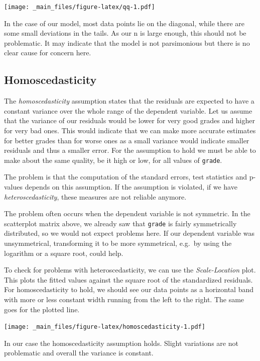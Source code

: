 \documentclass[
]{book}
\begin{document}
\texttt{[image: \_main\_files/figure-latex/qq-1.pdf]}

In the case of our model, most data points lie on the diagonal, while there are
some small deviations in the tails. As our n is large enough, this should not be
problematic. It may indicate that the model is not parsimonious but there is
no clear cause for concern here.

\hypertarget{homoscedasticity}{%
\subsection{Homoscedasticity}\label{homoscedasticity}}

The \emph{homoscedasticity} assumption states that the residuals are expected to have
a constant variance over the whole range of the dependent variable. Let us
assume that the variance of our residuals would be lower for very good grades
and higher for very bad ones. This would indicate that we can make more accurate
estimates for better grades than for worse ones as a small variance would
indicate smaller residuals and thus a smaller error. For the assumption to hold
we must be able to make about the same quality, be it high or low, for all
values of \texttt{grade}.

The problem is that the computation of the standard errors, test statistics and
p-values depends on this assumption. If the assumption is violated, if we have
\emph{heteroscedasticity}, these measures are not reliable anymore.

The problem often occurs when the dependent variable is not symmetric. In the
scatterplot matrix above, we already saw that \texttt{grade} is fairly symmetrically
distributed, so we would not expect problems here. If our dependent variable was
unsymmetrical, transforming it to be more symmetrical, e.g.~by using the
logarithm or a square root, could help.

To check for problems with heteroscedasticity, we can use the \emph{Scale-Location}
plot. This plots the fitted values against the square root of the standardized
residuals. For homoscedasticity to hold, we should see our data points as a
horizontal band with more or less constant width running from the left to the
right. The same goes for the plotted line.

\texttt{[image: \_main\_files/figure-latex/homoscedasticity-1.pdf]}

In our case the homoscedasticity assumption holds. Slight variations are not
problematic and overall the variance is constant.
\end{document}
